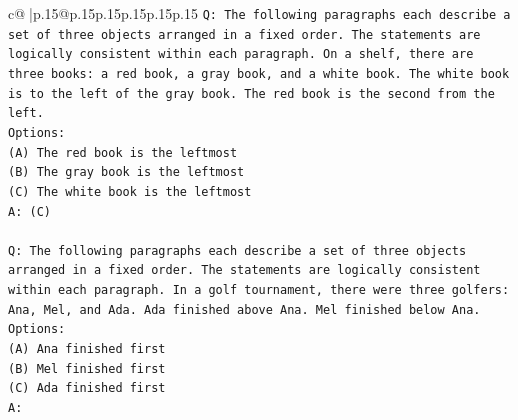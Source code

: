 \documentclass{article}
\begin{document}
{\begin{supertabular}{c@{$\;$}|p{.15\linewidth}@{}p{.15\linewidth}p{.15\linewidth}p{.15\linewidth}p{.15\linewidth}p{.15\linewidth}}
{{{\texttt{Q: The following paragraphs each describe a set of three objects arranged in a fixed order. The statements are logically consistent within each paragraph. On a shelf, there are three books: a red book, a gray book, and a white book. The white book is to the left of the gray book. The red book is the second from the left.} \\
\texttt{Options:} \\
\texttt{(A) The red book is the leftmost} \\
\texttt{(B) The gray book is the leftmost} \\
\texttt{(C) The white book is the leftmost} \\
\texttt{A: (C)} \\
\\ 
\texttt{Q: The following paragraphs each describe a set of three objects arranged in a fixed order. The statements are logically consistent within each paragraph. In a golf tournament, there were three golfers: Ana, Mel, and Ada. Ada finished above Ana. Mel finished below Ana.} \\
\texttt{Options:} \\
\texttt{(A) Ana finished first} \\
\texttt{(B) Mel finished first} \\
\texttt{(C) Ada finished first} \\
\texttt{A:} \\
            }
        }
    }
     \\ \\


\end{supertabular}}
\end{document}
